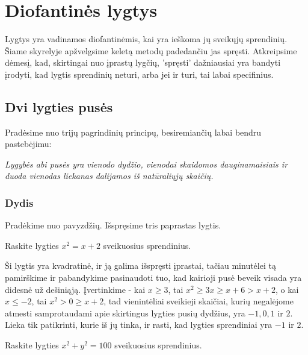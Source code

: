 \section{Diofantinės lygtys}

Lygtys yra vadinamos diofantinėmis, kai yra ieškoma jų sveikųjų
sprendinių. Šiame skyrelyje apžvelgsime keletą metodų padedančiu jas
spręsti. Atkreipsime dėmesį, kad, skirtingai nuo įprastų lygčių,
'spręsti' dažniausiai yra bandyti įrodyti, kad lygtis sprendinių neturi,
arba jei ir turi, tai labai specifinius.  

\subsection{Dvi lygties pusės}

Pradėsime nuo trijų pagrindinių principų, besiremiančių labai bendru
pastebėjimu:

\smallskip
\begin{center}\emph{Lygybės abi pusės yra vienodo dydžio, vienodai skaidomos
dauginamaisiais ir duoda vienodas liekanas dalijamos iš natūraliųjų
skaičių.}\end{center}
\smallskip

\subsubsection{Dydis}

Pradėkime nuo pavyzdžių. Išspręsime tris paprastas lygtis.
\begin{pav} 
  Raskite lygties $x^2 = x + 2$ sveikuosius sprendinius.
\end{pav}

\begin{sprendimas}
  Ši lygtis yra kvadratinė, ir ją galima išspręsti įprastai, tačiau minutėlei tą
  pamirškime ir pabandykime pasinaudoti tuo, kad kairioji pusė beveik visada yra didesnė
  už dešiniąją. Įvertinkime - kai $x\geq 3$, tai $x^2 \geq 3x \geq x + 6 >
  x+2$, o kai $x\leq -2$, tai $x^2 > 0 \geq x+2$, tad vienintėliai sveikieji
  skaičiai, kurių negalėjome atmesti samprotaudami apie skirtingus lygties
  pusių dydžius, yra $-1, 0, 1$ ir $2$. Lieka tik patikrinti, kurie iš jų
  tinka, ir rasti, kad lygties sprendiniai yra $-1$ ir $2$. 
\end{sprendimas}

\begin{pav}
  Raskite lygties $x^2 + y^2 = 100$ sveikuosius sprendinius.
\end{pav}

